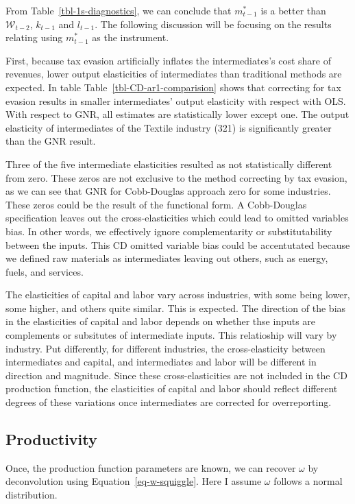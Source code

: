 \documentclass[
  12pt]{article}
\theoremstyle{definition}
\theoremstyle{remark}
\begin{document}
From Table~\ref{tbl-1s-diagnostics}, we can conclude that \(m^*_{t-1}\)
is a better than \(\mathcal{W}_{t-2}\), \(k_{t-1}\) and \(l_{t-1}\). The
following discussion will be focusing on the results relating using
\(m^*_{t-1}\) as the instrument.

First, because tax evasion artificially inflates the intermediates's
cost share of revenues, lower output elasticities of intermediates than
traditional methods are expected. In table
Table~\ref{tbl-CD-ar1-comparision} shows that correcting for tax evasion
results in smaller intermediates' output elasticity with respect with
OLS. With respect to GNR, all estimates are statistically lower except
one. The output elasticity of intermediates of the Textile industry
(321) is significantly greater than the GNR result.

Three of the five intermediate elasticities resulted as not
statistically different from zero. These zeros are not exclusive to the
method correcting by tax evasion, as we can see that GNR for
Cobb-Douglas approach zero for some industries. These zeros could be the
result of the functional form. A Cobb-Douglas specification leaves out
the cross-elasticities which could lead to omitted variables bias. In
other words, we effectively ignore complementarity or substitutability
between the inputs. This CD omitted variable bias could be accentutated
because we defined raw materials as intermediates leaving out others,
such as energy, fuels, and services.

The elasticities of capital and labor vary across industries, with some
being lower, some higher, and others quite similar. This is expected.
The direction of the bias in the elasticities of capital and labor
depends on whether thse inputs are complements or subsitutes of
intermediate inputs. This relatioship will vary by industry. Put
differently, for different industries, the cross-elasticity between
intermediates and capital, and intermediates and labor will be different
in direction and magnitude. Since these cross-elasticities are not
included in the CD production function, the elasticities of capital and
labor should reflect different degrees of these variations once
intermediates are corrected for overreporting.

\subsection{Productivity}\label{productivity}

Once, the production function parameters are known, we can recover
\(\omega\) by deconvolution using Equation~\ref{eq-w-squiggle}. Here I
assume \(\omega\) follows a normal distribution.
\end{document}
